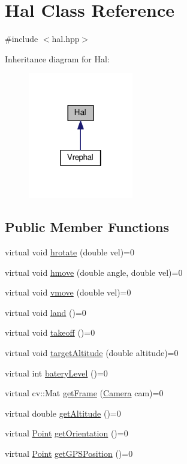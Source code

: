 \hypertarget{class_hal}{}\section{Hal Class Reference}
\label{class_hal}


{\ttfamily \#include $<$hal.\+hpp$>$}



Inheritance diagram for Hal\+:
\nopagebreak
\begin{figure}[H]
\begin{center}
\leavevmode
\includegraphics[width=130pt]{class_hal__inherit__graph}
\end{center}
\end{figure}
\subsection*{Public Member Functions}
\begin{DoxyCompactItemize}
\item 
virtual void \hyperlink{class_hal_a38abd3a6254650b4c28035521e3efa40}{hrotate} (double vel)=0
\item 
virtual void \hyperlink{class_hal_a15c5ef8f3009634d0bf6262b826235b0}{hmove} (double angle, double vel)=0
\item 
virtual void \hyperlink{class_hal_ac50577557c4e55ad643175f95ac2f584}{vmove} (double vel)=0
\item 
virtual void \hyperlink{class_hal_a8376a2668ed62e4d4d70f7b6336e84c4}{land} ()=0
\item 
virtual void \hyperlink{class_hal_ac1968d088d9b905eb99fbe3f77d76757}{takeoff} ()=0
\item 
virtual void \hyperlink{class_hal_a11055efac17ca7bd23b8b6df4ce7938c}{target\+Altitude} (double altitude)=0
\item 
virtual int \hyperlink{class_hal_a709862946eb7bc952156384187a17c82}{batery\+Level} ()=0
\item 
virtual cv\+::\+Mat \hyperlink{class_hal_ab0ae734602805980b9c6777db73058e9}{get\+Frame} (\hyperlink{hal_8hpp_adc0591c2c6aa3aa864336ece4978ab62}{Camera} cam)=0
\item 
virtual double \hyperlink{class_hal_a9740bffd75eab1959fefea03545d5785}{get\+Altitude} ()=0
\item 
virtual \hyperlink{struct_point}{Point} \hyperlink{class_hal_ad5356f99ad5599b471b819972d4fde86}{get\+Orientation} ()=0
\item 
virtual \hyperlink{struct_point}{Point} \hyperlink{class_hal_af4bb24ecd743845542ff724315511bea}{get\+G\+P\+S\+Position} ()=0
\end{DoxyCompactItemize}


